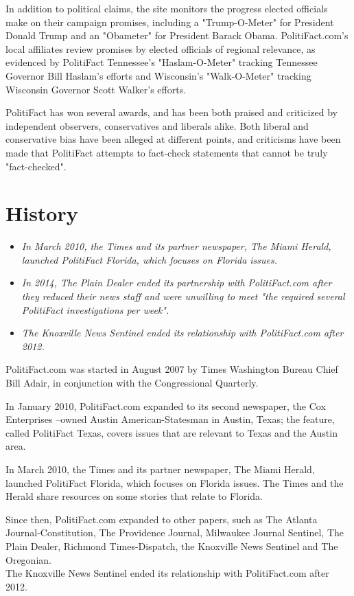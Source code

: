 In addition to political claims, the site monitors the progress elected
officials make on their campaign promises, including a "Trump-O-Meter"
for President Donald Trump and an "Obameter" for President Barack Obama.
PolitiFact.com's local affiliates review promises by elected officials
of regional relevance, as evidenced by PolitiFact Tennessee's
"Haslam-O-Meter" tracking Tennessee Governor Bill Haslam's efforts and
Wisconsin's "Walk-O-Meter" tracking Wisconsin Governor Scott Walker's
efforts.

PolitiFact has won several awards, and has been both praised and
criticized by independent observers, conservatives and liberals alike.
Both liberal and conservative bias have been alleged at different
points, and criticisms have been made that PolitiFact attempts to
fact-check statements that cannot be truly "fact-checked".

\section{History}\label{history}

\begin{itemize}
\item
  \emph{In March 2010, the Times and its partner newspaper, The Miami
  Herald, launched PolitiFact Florida, which focuses on Florida issues.}
\item
  \emph{In 2014, The Plain Dealer ended its partnership with
  PolitiFact.com after they reduced their news staff and were unwilling
  to meet "the required several PolitiFact investigations per week".}
\item
  \emph{The Knoxville News Sentinel ended its relationship with
  PolitiFact.com after 2012.}
\end{itemize}

PolitiFact.com was started in August 2007 by Times Washington Bureau
Chief Bill Adair, in conjunction with the Congressional Quarterly.

In January 2010, PolitiFact.com expanded to its second newspaper, the
Cox Enterprises --owned Austin American-Statesman in Austin, Texas; the
feature, called PolitiFact Texas, covers issues that are relevant to
Texas and the Austin area.

In March 2010, the Times and its partner newspaper, The Miami Herald,
launched PolitiFact Florida, which focuses on Florida issues. The Times
and the Herald share resources on some stories that relate to Florida.

Since then, PolitiFact.com expanded to other papers, such as The Atlanta
Journal-Constitution, The Providence Journal, Milwaukee Journal
Sentinel, The Plain Dealer, Richmond Times-Dispatch, the Knoxville News
Sentinel and The Oregonian.\\
The Knoxville News Sentinel ended its relationship with PolitiFact.com
after 2012.


